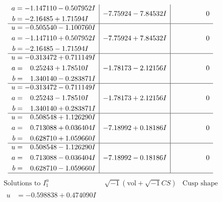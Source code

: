 \documentclass[1p]{elsarticle_modified}
\theoremstyle{definition}
\newcommand{\I}{\sqrt{-1}}
\begin{document}
$$\begin{array}{c|c|c}
\begin{aligned}
a &= -1.147110 - 0.507952 I \\
b &= -2.16485 + 1.71594 I\end{aligned}
 & -7.75924 - 7.84532 I & \phantom{-0.000000 } 0 \\ \hline\begin{aligned}
u &= -0.505540 - 1.100760 I \\
a &= -1.147110 + 0.507952 I \\
b &= -2.16485 - 1.71594 I\end{aligned}
 & -7.75924 + 7.84532 I & \phantom{-0.000000 } 0 \\ \hline\begin{aligned}
u &= -0.313472 + 0.711149 I \\
a &= \phantom{-}0.25243 + 1.78510 I \\
b &= \phantom{-}1.340140 - 0.283871 I\end{aligned}
 & -1.78173 - 2.12156 I & \phantom{-0.000000 } 0 \\ \hline\begin{aligned}
u &= -0.313472 - 0.711149 I \\
a &= \phantom{-}0.25243 - 1.78510 I \\
b &= \phantom{-}1.340140 + 0.283871 I\end{aligned}
 & -1.78173 + 2.12156 I & \phantom{-0.000000 } 0 \\ \hline\begin{aligned}
u &= \phantom{-}0.508548 + 1.126290 I \\
a &= \phantom{-}0.713088 + 0.036404 I \\
b &= \phantom{-}0.628710 + 1.059660 I\end{aligned}
 & -7.18992 + 0.18186 I & \phantom{-0.000000 } 0 \\ \hline\begin{aligned}
u &= \phantom{-}0.508548 - 1.126290 I \\
a &= \phantom{-}0.713088 - 0.036404 I \\
b &= \phantom{-}0.628710 - 1.059660 I\end{aligned}
 & -7.18992 - 0.18186 I & \phantom{-0.000000 } 0\\
 \hline 
 \end{array}$$\newpage$$\begin{array}{c|c|c}  
\text{Solutions to }I^u_{1}& \I (\text{vol} + \sqrt{-1}CS) & \text{Cusp shape}\\
 \hline 
\begin{aligned}
u &= -0.598838 + 0.474090 I \\

\end{aligned}
\end{array}$$
\end{document}
